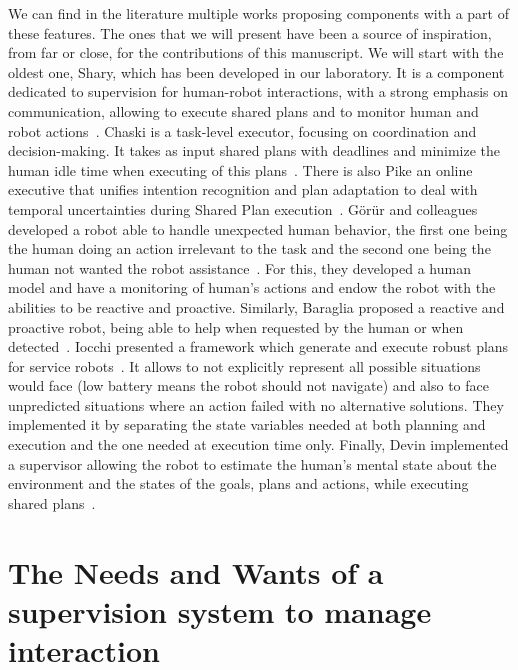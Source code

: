 \documentclass[a4paper,11pt,twoside]{StyleThese}
\begin{document}
We can find in the literature multiple works proposing components with a part of these features. The ones that we will present have been a source of inspiration, from far or close, for the contributions of this manuscript. We will start with the oldest one, Shary, which has been developed in our laboratory. It is a component dedicated to supervision for human-robot interactions, with a strong emphasis on communication, allowing to execute shared plans and to monitor human and robot actions~\cite{clodic_2009_shary}. Chaski is a task-level executor, focusing on coordination and decision-making. It takes as input shared plans with deadlines and minimize the human idle time when executing of this plans~\cite{shah_2011_improved}. There is also Pike an online executive that unifies intention recognition and plan adaptation to deal with temporal uncertainties during Shared Plan execution~\cite{karpas_2015_robust}. G\"{o}r\"{u}r and colleagues developed a robot able to handle unexpected human behavior, the first one being the human doing an action irrelevant to the task and the second one being the human not wanted the robot assistance~\cite{gorur_2017_toward, gorur_2018_social}. For this, they developed a human model and have a monitoring of human's actions and endow the robot with the abilities to be reactive and proactive. Similarly, Baraglia \etal{} proposed a reactive and proactive robot, being able to help when requested by the human or when detected~\cite{baraglia_2017_efficient}. Iocchi \etal{} presented a framework which generate and execute robust plans for service robots~\cite{iocchi_2016_practical}. It allows to not explicitly represent all possible situations would face (\eg low battery means the robot should not navigate) and also to face unpredicted situations where an action failed with no alternative solutions. They implemented it by separating the state variables needed at both planning and execution and the one needed at execution time only. Finally, Devin \etal{} implemented a supervisor allowing the robot to estimate the human's mental state about the environment and the states of the goals, plans and actions, while executing shared plans~\cite{devin_2016_implemented}.



\section{The Needs and Wants of a supervision system to manage interaction} %

\end{document}
